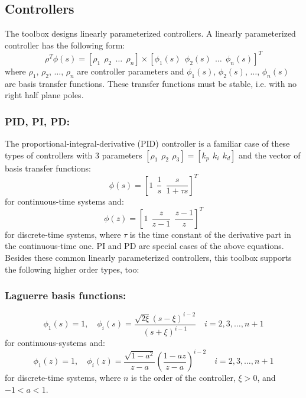 \documentclass [12pt , a4paper] {report}
\begin{document}
\subsection{Controllers}

The toolbox designs linearly parameterized controllers. A linearly parameterized controller has the following form:
\begin{equation}
\label{linparcon}
\rho^T \phi(s)=[\rho_1 \: \: \rho_2 \: \: \ldots \:\: \rho_n]\times [\phi_1(s) \: \: \phi_2(s) \:\: \ldots \:\: \phi_n(s)]^T
\end{equation}
where $\rho_1$, $\rho_2$, $\ldots$, $\rho_n$ are controller parameters and $\phi_1(s)$, $\phi_2(s)$, $\ldots$, $\phi_n(s)$ are basis transfer functions. These transfer functions must be stable, i.e. with no right half plane poles. 

\subsubsection{PID, PI, PD:}

The proportional-integral-derivative (PID) controller is a familiar case of these types of controllers with 3 parameters $[\rho_1 \:\, \rho_2 \:\, \rho_3]=[k_p \:\, k_i \:\, k_d]$ and the vector of basis transfer functions:
\begin{equation}
\phi (s)=[1 \:\: \frac{1}{s} \:\: \frac{s}{1+\tau s}]^T
\end{equation}
for continuous-time systems and:
\begin{equation}
\phi (z)=[1 \:\: \frac{z}{z-1} \:\: \frac{z-1}{z}]^T 
\end{equation}
for discrete-time systems, where $\tau$ is the time constant of the derivative part in the continuous-time one. PI and PD are special cases of the above equations. Besides these common linearly parameterized controllers, this toolbox supports the following higher order types, too: 

\subsubsection{Laguerre basis functions:}

\begin{equation}
\phi_1(s)=1, \quad \phi_i(s)=\frac{\sqrt{2\xi}(s-\xi)^{i-2}}{(s+\xi)^{i-1}} \quad   i=2,3,\ldots,n+1 
\end{equation}
for continuous-systems and:
\begin{equation}
\phi_1(z)=1, \quad \phi_i(z)=\frac{\sqrt{1-a^2}}{z-a} \left(\frac{1-az}{z-a}\right)^{i-2} \quad   i=2,3,\ldots,n+1 
\end{equation}
for discrete-time systems, where $n$ is the order of the controller, $\xi>0$, and $-1<a<1$.
\end{document}
